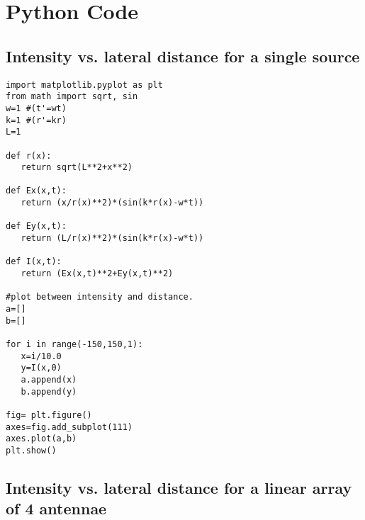 \chapter{Python Code}

\section{Intensity vs. lateral distance for a single source}\label{code:single}

\begin{Verbatim}[fontsize=\small,baselinestretch=0.9]
import matplotlib.pyplot as plt
from math import sqrt, sin
w=1 #(t'=wt)
k=1 #(r'=kr)
L=1

def r(x):
   return sqrt(L**2+x**2)

def Ex(x,t):
   return (x/r(x)**2)*(sin(k*r(x)-w*t))

def Ey(x,t):
   return (L/r(x)**2)*(sin(k*r(x)-w*t))

def I(x,t):
   return (Ex(x,t)**2+Ey(x,t)**2)

#plot between intensity and distance.
a=[]
b=[]

for i in range(-150,150,1):
   x=i/10.0
   y=I(x,0)
   a.append(x)
   b.append(y)

fig= plt.figure()
axes=fig.add_subplot(111)
axes.plot(a,b)
plt.show()
\end{Verbatim}


\section{Intensity vs. lateral distance for a linear array of 4 antennae}\label{code:four}

